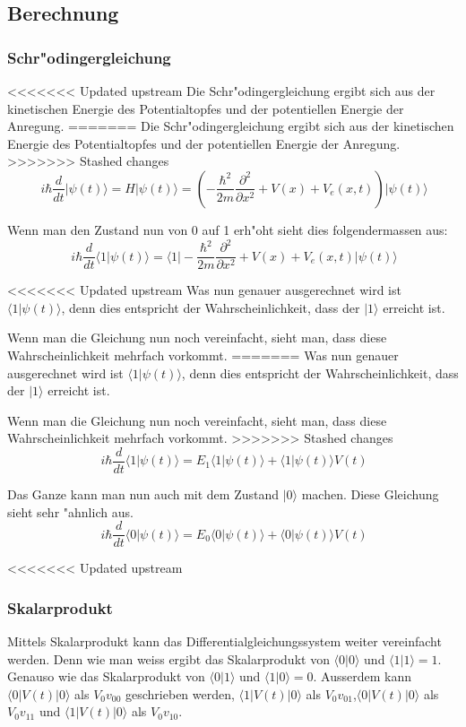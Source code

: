 \begin{refsection}
\subsection{Berechnung}
\subsubsection{Schr"odingergleichung}

<<<<<<< Updated upstream
Die Schr"odingergleichung ergibt sich aus der kinetischen Energie des
Potentialtopfes und der potentiellen Energie der Anregung.
=======
Die Schr"odingergleichung ergibt sich aus der kinetischen Energie des Potentialtopfes und der potentiellen Energie der Anregung.
>>>>>>> Stashed changes
\[
\ i\hbar\frac{d}{dt}|\psi(t)\rangle = H|\psi(t)\rangle = (-\frac{\hbar^2}{2m} \frac{\partial^2}{\partial x^2}+V(x)+V_{e}(x,t))|\psi(t)\rangle
\]

Wenn man den Zustand nun von 0 auf 1 erh"oht sieht dies folgendermassen aus:
\[
\ i\hbar\frac{d}{dt}\langle1|\psi(t)\rangle = \langle1|-\frac{\hbar^2}{2m} \frac{\partial^2}{\partial x^2}+V(x)+V_{e}(x,t)|\psi(t)\rangle
\]

<<<<<<< Updated upstream
Was nun genauer ausgerechnet wird ist $\langle1|\psi(t)\rangle$, denn
dies entspricht der Wahrscheinlichkeit, dass der $|1\rangle$ erreicht ist.

Wenn man die Gleichung nun noch vereinfacht, sieht man, dass diese
Wahrscheinlichkeit mehrfach vorkommt.
=======
Was nun genauer ausgerechnet wird ist $\langle1|\psi(t)\rangle$, denn dies entspricht der Wahrscheinlichkeit, dass der $|1\rangle$ erreicht ist.

Wenn man die Gleichung nun noch vereinfacht, sieht man, dass diese Wahrscheinlichkeit mehrfach vorkommt.
>>>>>>> Stashed changes
\[
\ i\hbar\frac{d}{dt}\langle1|\psi(t)\rangle = E_{1}\langle1|\psi(t)\rangle+\langle1|\psi(t)\rangle V(t)
\]

Das Ganze kann man nun auch mit dem Zustand $|0\rangle$ machen. Diese
Gleichung sieht sehr "ahnlich aus.
\[
\ i\hbar\frac{d}{dt}\langle0|\psi(t)\rangle = E_{0}\langle0|\psi(t)\rangle+\langle0|\psi(t)\rangle V(t)
\]

<<<<<<< Updated upstream
\subsubsection{Skalarprodukt}
Mittels Skalarprodukt kann das Differentialgleichungssystem weiter
vereinfacht werden.
Denn wie man weiss ergibt das Skalarprodukt von $\langle0|0\rangle$
und $\langle1|1\rangle = 1$. Genauso wie das Skalarprodukt von
$\langle0|1\rangle$ und $\langle1|0\rangle = 0$.
Ausserdem kann  $\langle0|V(t)|0\rangle$ als $V_{0}v_{00}$
geschrieben werden, $\langle1|V(t)|0\rangle$ als
$V_{0}v_{01}$,$\langle0|V(t)|0\rangle$ als $V_{0}v_{11}$ und
$\langle1|V(t)|0\rangle$ als $V_{0}v_{10}$.


\end{refsection}
